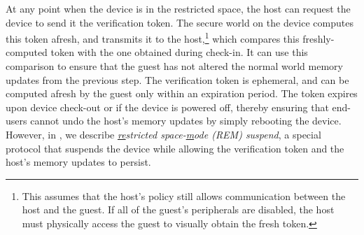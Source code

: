 \begin{mylist}
At any point when the device is in the restricted space, the host can request
the device to send it the verification token. The secure world on the device
computes this token afresh, and transmits it to the host,\footnote{This assumes
that the host's policy still allows communication between the host and the
guest. If all of the guest's peripherals are disabled, the host must physically
access the guest to visually obtain the fresh token.} which compares this
freshly-computed token with the one obtained during check-in. It can use this
comparison to ensure that the guest has not altered the normal world memory
updates from the previous step.  The verification token is ephemeral, and can
be computed afresh by the guest only within an expiration period. The token
expires upon device check-out or if the device is powered off, thereby ensuring
that end-users cannot undo the host's memory updates by simply rebooting the
device.  However, in , we describe
\textit{\underline{re}stricted space-\underline{m}ode (REM) suspend}, a special
protocol that suspends the device while allowing the verification token and the
host's memory updates to persist.
%
\end{mylist}


